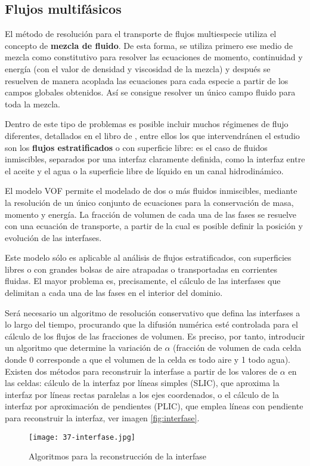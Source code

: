 \subsection{Flujos multifásicos}\label{header-n518}

El método de resolución para el transporte de flujos multiespecie
utiliza el concepto de \textbf{mezcla de fluido}. De esta forma, se
utiliza primero ese medio de mezcla como constitutivo para resolver las
ecuaciones de momento, continuidad y energía (con el valor de densidad y
viscosidad de la mezcla) y después se resuelven de manera acoplada las
ecuaciones para cada especie a partir de los campos globales obtenidos.
Así se consigue resolver un único campo fluido para toda la mezcla.

Dentro de este tipo de problemas es posible incluir muchos régimenes de
flujo diferentes, detallados en el libro de \cite{Fernandez12}, entre ellos los que intervendránen el estudio son los
\textbf{flujos estratificados} o con superficie libre: es el caso de
fluidos inmiscibles, separados por una interfaz claramente definida,
como la interfaz entre el aceite y el agua o la superficie libre de
líquido en un canal hidrodinámico.

El modelo VOF permite el modelado de dos o más fluidos inmiscibles,
mediante la resolución de un único conjunto de ecuaciones para la
conservación de masa, momento y energía. La fracción de volumen de cada
una de las fases se resuelve con una ecuación de transporte, a partir de
la cual es posible definir la posición y evolución de las interfases.

Este modelo sólo es aplicable al análisis de flujos estratificados, con
superficies libres o con grandes bolsas de aire atrapadas o
transportadas en corrientes fluidas. El mayor problema es, precisamente,
el cálculo de las interfases que delimitan a cada una de las fases en el
interior del dominio.

Será necesario un algoritmo de resolución conservativo que defina las
interfases a lo largo del tiempo, procurando que la difusión numérica
esté controlada para el cálculo de los flujos de las fracciones de
volumen. Es preciso, por tanto, introducir un algoritmo que determine la
variación de \(\alpha\) (fracción de volumen de cada celda donde 0
corresponde a que el volumen de la celda es todo aire y 1 todo agua).
Existen dos métodos para reconstruir la interfase a partir de los
valores de \(\alpha\) en las celdas: cálculo de la interfaz por líneas
simples (SLIC), que aproxima la interfaz por líneas rectas paralelas a
los ejes coordenados, o el cálculo de la interfaz por aproximación de
pendientes (PLIC), que emplea líneas con pendiente para reconstruir la
interfaz, ver imagen \autoref{fig:interfase}.

\begin{figure}[ht]
\centering
\texttt{[image: 37-interfase.jpg]}
\caption[Algoritmos para la reconstrucción de la interfase]{Algoritmos para la reconstrucción de la interfase \cite{kothe96}}
\label{fig:interfase}
\end{figure}
